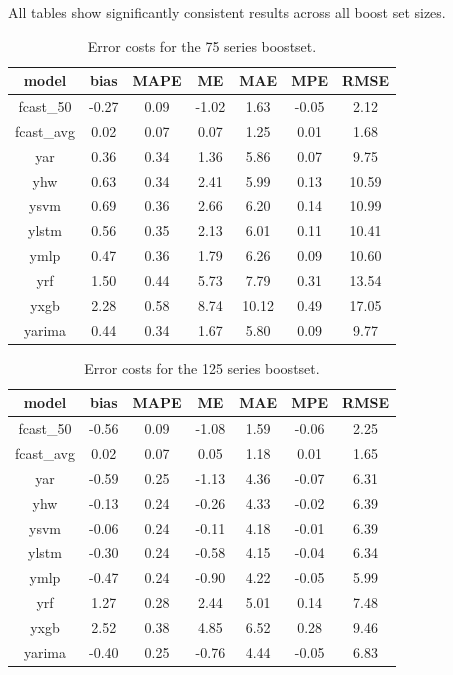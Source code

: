\documentclass[preprint,11pt,authoryear]{elsarticle}
\begin{document}
All tables show significantly consistent results across all boost set sizes.

\begin{table}[h]
	\centering
	\renewcommand{\arraystretch}{0.75}
	\begin{tabular}{ccccccc}
		model & bias & MAPE & ME & MAE & MPE & RMSE \\
		\hline
		fcast\_50   &-0.27 & 0.09 &-1.02 & 1.63 &-0.05 &  2.12 \\
		fcast\_avg  & 0.02 & 0.07 & 0.07 & 1.25 & 0.01 &  1.68 \\
		yar         & 0.36 & 0.34 & 1.36 & 5.86 & 0.07 &  9.75 \\
		yhw         & 0.63 & 0.34 & 2.41 & 5.99 & 0.13 & 10.59 \\
		ysvm        & 0.69 & 0.36 & 2.66 & 6.20 & 0.14 & 10.99 \\
		ylstm       & 0.56 & 0.35 & 2.13 & 6.01 & 0.11 & 10.41 \\
		ymlp        & 0.47 & 0.36 & 1.79 & 6.26 & 0.09 & 10.60 \\
		yrf         & 1.50 & 0.44 & 5.73 & 7.79 & 0.31 & 13.54 \\
		yxgb        & 2.28 & 0.58 & 8.74 &10.12 & 0.49 & 17.05 \\
		yarima      & 0.44 & 0.34 & 1.67 & 5.80 & 0.09 &  9.77 \\
		\hline
	\end{tabular}
	\caption{Error costs for the 75 series boostset.}
	\label{table:app75}
\end{table}

\begin{table}
	\centering
	\renewcommand{\arraystretch}{0.75}
	\begin{tabular}{ccccccc}
		model & bias & MAPE & ME & MAE & MPE & RMSE \\
		\hline
		fcast\_50   & -0.56 & 0.09 & -1.08 & 1.59 & -0.06 & 2.25  \\
		fcast\_avg  &  0.02 & 0.07 &  0.05 & 1.18 &  0.01 & 1.65  \\
		yar         & -0.59 & 0.25 & -1.13 & 4.36 & -0.07 & 6.31  \\
		yhw         & -0.13 & 0.24 & -0.26 & 4.33 & -0.02 & 6.39  \\
		ysvm        & -0.06 & 0.24 & -0.11 & 4.18 & -0.01 & 6.39  \\
		ylstm       & -0.30 & 0.24 & -0.58 & 4.15 & -0.04 & 6.34  \\
		ymlp        & -0.47 & 0.24 & -0.90 & 4.22 & -0.05 & 5.99  \\
		yrf         &  1.27 & 0.28 &  2.44 & 5.01 &  0.14 & 7.48  \\
		yxgb        &  2.52 & 0.38 &  4.85 & 6.52 &  0.28 & 9.46  \\
		yarima      & -0.40 & 0.25 & -0.76 & 4.44 & -0.05 & 6.83  \\
		\hline
	\end{tabular}
	\caption{Error costs for the 125 series boostset.}
	\label{table:app125}
\end{table}
\end{document}
